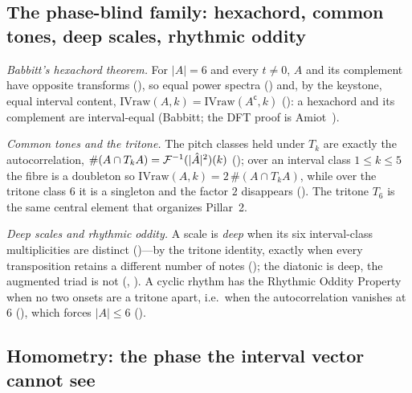 \subsection{The phase-blind family: hexachord, common tones, deep scales, rhythmic oddity}
\label{sec:p1-family}


\emph{Babbitt's hexachord theorem.} For $|A|=6$ and every $t\neq0$, $A$ and its complement have
opposite transforms (), so equal power spectra ()
and, by the keystone, equal interval content, $\mathrm{IVraw}(A,k)=\mathrm{IVraw}(A^{\mathsf c},k)$
(): a hexachord and its complement are interval-equal (Babbitt; the DFT
proof is Amiot~\cite{Amiot}).

\emph{Common tones and the tritone.} The pitch classes held under $T_k$ are exactly the
autocorrelation, $\#(A\cap T_kA)=\mathcal{F}^{-1}(|\hat{A}|^2)(k)$ (); over an
interval class $1\le k\le5$ the fibre is a doubleton so $\mathrm{IVraw}(A,k)=2\,\#(A\cap T_kA)$,
while over the tritone class $6$ it is a singleton and the factor $2$ disappears
(). The tritone $T_6$ is the same central element that organizes Pillar~2.

\emph{Deep scales and rhythmic oddity.} A scale is \emph{deep} when its six interval-class
multiplicities are distinct ()---by the tritone identity, exactly when every
transposition retains a different number of notes (); the
diatonic is deep, the augmented triad is not (,
). A cyclic rhythm has the Rhythmic Oddity Property when no two
onsets are a tritone apart, i.e.\ when the autocorrelation vanishes at $6$
(), which forces $|A|\le6$ ().

\subsection{Homometry: the phase the interval vector cannot see}\label{sec:p1-homometry}


